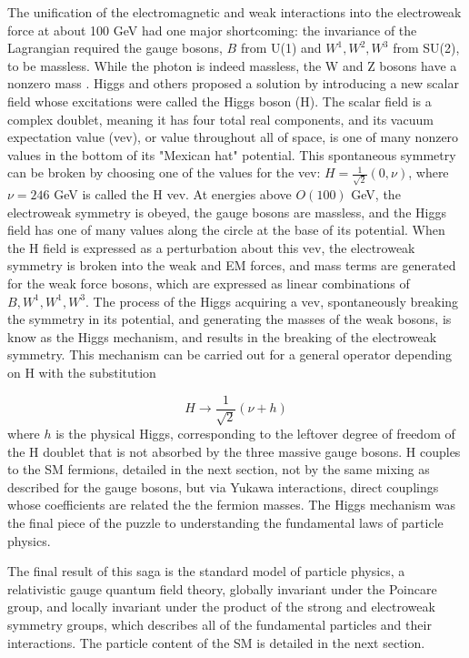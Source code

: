 \indent The unification of the electromagnetic and weak interactions into the electroweak force at about 100 GeV had one major shortcoming: the invariance of the Lagrangian required the gauge bosons, $B$ from U(1) and $W^1, W^2, W^3$ from SU(2), to be massless. While the photon is indeed massless, the W and Z bosons have a nonzero mass \cite{}. Higgs and others \cite{PhysRevLett.13.321, Higgs:1964ia, PhysRevLett.13.508, PhysRevLett.13.585, PhysRev.145.1156, Kibble:1967sv} proposed a solution by introducing a new scalar field whose excitations were called the Higgs boson (H). The scalar field is a complex doublet, meaning it has four total real components, and its vacuum expectation value (vev), or value throughout all of space, is one of many nonzero values in the bottom of its "Mexican hat" potential. This spontaneous symmetry can be broken by choosing one of the values for the vev: $H = \frac{1}{\sqrt{2}} (0, \nu)$, where $\nu=246$ GeV is called the H vev. At energies above $O(100)$ GeV, the electroweak symmetry is obeyed, the gauge bosons are massless, and the Higgs field has one of many values along the circle at the base of its potential. When the H field is expressed as a perturbation about this vev, the electroweak symmetry is broken into the weak and EM forces, and mass terms are generated for the weak force bosons, which are expressed as linear combinations of $B, W^1, W^1, W^3$. The process of the Higgs acquiring a vev, spontaneously breaking the symmetry in its potential, and generating the masses of the weak bosons, is know as the Higgs mechanism, and results in the breaking of the electroweak symmetry. This mechanism can be carried out for a general operator depending on H with the substitution

\begin{equation}
H \rightarrow \frac{1}{\sqrt{2}} (\nu + h)
\end{equation}
where $h$ is the physical Higgs, corresponding to the leftover degree of freedom of the H doublet that is not absorbed by the three massive gauge bosons. H couples to the SM fermions, detailed in the next section, not by the same mixing as described for the gauge bosons, but via Yukawa interactions, direct couplings whose coefficients are related the the fermion masses. The Higgs mechanism was the final piece of the puzzle to understanding the fundamental laws of particle physics.
 
\indent The final result of this saga is the standard model of particle physics, a relativistic gauge quantum field theory, globally invariant under the Poincare group, and locally invariant under the product of the strong and electroweak symmetry groups, which describes all of the fundamental particles and their interactions. The particle content of the SM is detailed in the next section.

